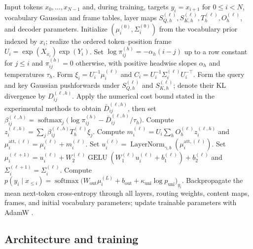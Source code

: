 \documentclass[twoside,11pt]{article}
\begin{document}
\begin{algorithm}[t]
\caption{Causal Gaussian attention and supervised predictive learning}
\label{alg:predictive_content_current}
\begin{algorithmic}[1]
\REQUIRE Input tokens $x_0,\ldots,x_{N-1}$ and, during training, targets $y_i=x_{i+1}$ for $0\le i<N$, vocabulary Gaussian and frame tables, layer maps $S_{Q,h}^{(\ell)},S_{K,h}^{(\ell)},T_h^{(\ell)},O_h^{(\ell)}$, and decoder parameters.
\STATE Initialize $(\mu_i^{(0)},\Sigma_i^{(0)})$ from the vocabulary prior indexed by $x_i$; realize the ordered token--position frame $U_i=\exp(X_{x_i})\exp(Y_i)$.
\STATE Set $\log\pi_{ij}^{(h)}=-\alpha_h(i-j)$ up to a row constant for $j\le i$ and $\pi_{ij}^{(h)}=0$ otherwise, with positive headwise slopes $\alpha_h$ and temperatures $\tau_h$.
\STATE Form $\xi_i=U_i^{-1}\mu_i^{(\ell)}$ and $C_i=U_i^{-1}\Sigma_i^{(\ell)}U_i^{-\top}$.
\STATE Form the query and key Gaussian pushforwards under $S_{Q,h}^{(\ell)}$ and $S_{K,h}^{(\ell)}$; denote their KL divergence by $D_{ij}^{(\ell,h)}$.
\STATE Apply the numerical cost bound stated in the experimental methods to obtain $\bar D_{ij}^{(\ell,h)}$, then set $\beta_{ij}^{(\ell,h)}=\operatorname{softmax}_{j}\bigl(\log\pi_{ij}^{(h)}-\bar D_{ij}^{(\ell,h)}/\tau_h\bigr)$.
\STATE Compute $z_i^{(\ell,h)}=\sum_j\beta_{ij}^{(\ell,h)}T_h^{(\ell)}\xi_j$.
\ENDFOR
\STATE Compute $m_i^{(\ell)}=U_i\sum_h O_h^{(\ell)}z_i^{(\ell,h)}$ and $\mu_i^{\mathrm{att},(\ell)}=\mu_i^{(\ell)}+m_i^{(\ell)}$.
\STATE Set $u_i^{(\ell)}=\operatorname{LayerNorm}_{\gamma,b}(\mu_i^{\mathrm{att},(\ell)})$.
\STATE Set $\mu_i^{(\ell+1)}=u_i^{(\ell)}+W_2^{(\ell)}\operatorname{GELU}(W_1^{(\ell)}u_i^{(\ell)}+b_1^{(\ell)})+b_2^{(\ell)}$ and $\Sigma_i^{(\ell+1)}=\Sigma_i^{(\ell)}$.
\ENDFOR
\STATE Compute $p(y_i\mid x_{\le i})=\operatorname{softmax}\bigl(W_{\mathrm{out}}\mu_i^{(L)}+b_{\mathrm{out}}+\kappa_{\mathrm{uni}}\log p_{\mathrm{uni}}\bigr)_{y_i}$.
\STATE Backpropagate the mean next-token cross-entropy through all layers, routing weights, content maps, frames, and initial vocabulary parameters; update trainable parameters with AdamW \citep{Loshchilov2019AdamW}.
\ENDIF
\end{algorithmic}
\end{algorithm}

\subsection{Architecture and training}
\label{sec:relational_run}
\end{document}
